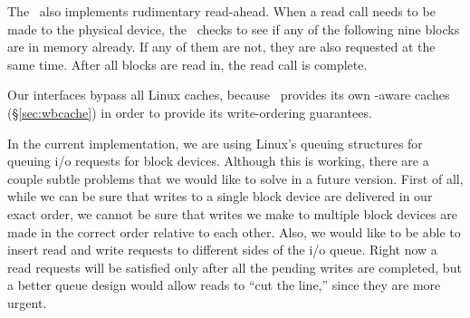 The \module\ also implements rudimentary read-ahead. When a read call needs to
be made to the physical device, the \module\ checks to see if any of the
following nine blocks are in memory already. If any of them are not, they are
also requested at the same time. After all blocks are read in, the read call is
complete.

Our interfaces bypass all Linux caches, because \Kudos\ provides its own
\chdesc-aware caches (\S\ref{sec:wbcache}) in order to provide its
write-ordering guarantees.

In the current implementation, we are using Linux's queuing structures for
queuing i/o requests for block devices. Although this is working, there are a
couple subtle problems that we would like to solve in a future version. First of
all, while we can be sure that writes to a single block device are delivered in
our exact order, we cannot be sure that writes we make to multiple block devices
are made in the correct order relative to each other. Also, we would like to be
able to insert read and write requests to different sides of the i/o queue.
Right now a read requests will be satisfied only after all the pending writes
are completed, but a better queue design would allow reads to ``cut the line,''
since they are more urgent.
